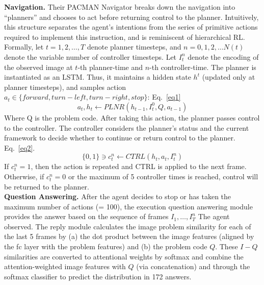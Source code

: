 \documentclass[10pt,twocolumn,letterpaper]{article}
\begin{document}
        \textbf{Navigation.} Their PACMAN Navigator breaks down the navigation into ``planners'' and chooses to act before returning control to the planner. Intuitively, this structure separates the agent's intentions from the series of primitive actions required to implement this instruction, and is reminiscent of hierarchical RL. Formally, let $t = 1, 2, \dots , T$ denote planner timesteps, and $n = 0, 1, 2, \dots N(t)$ denote the variable number of controller timesteps. Let $I^n_t$ denote the encoding of the observed image at $t$-th planner-time and $n$-th controller-time. The planner is instantiated as an LSTM. Thus, it maintains a hidden state $h^t$ (updated only at planner timesteps), and samples action $a_t \in \{forward, turn-left, turn-right, stop\}$: Eq.~\ref{eq1} \\
        \begin{equation}
        a_t, h_t \gets PLNR( h_{t-1}, I^0_t , Q, a_{t-1})
        \label{eq1}
        \end{equation}
        Where Q is the problem code. After taking this action, the planner passes control to the controller. The controller considers the planner's status and the current framework to decide whether to continue or return control to the planner. Eq.~\ref{eq2}. \\
        \begin{equation}
        \{0, 1\} \ni c_{t}^{n}\gets CTRL ( h_t, a_t, I^n_t )
        \label{eq2}
        \end{equation}
        If $c^n_t = 1$, then the action is repeated and CTRL is applied to the next frame. Otherwise, if $c^n_t = 0$ or the maximum of 5 controller times is reached, control will be returned to the planner. \\
        \textbf{Question Answering.} After the agent decides to stop or has taken the maximum number of actions (= 100), the execution question answering module provides the answer based on the sequence of frames $I_1 ,\dots, I_T^n$ The agent observed. The reply module calculates the image problem similarity for each of the last 5 frames by (a) the dot product between the image features (aligned by the fc layer with the problem features) and (b) the problem code $Q$. These $I-Q$ similarities are converted to attentional weights by softmax and combine the attention-weighted image features with $Q$ (via concatenation) and through the softmax classifier to predict the distribution in 172 answers.
\end{document}
